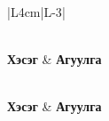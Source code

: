 \begin{longtable}{|L{4cm}|L{\dimexpr\textwidth-4cm-3\arrayrulewidth\relax}|}
\caption{Ажлын явц: Банкны загвар үүсгэх (UC-FS-02)}\label{tab:ucfs02}\\ \hline
\textbf{Хэсэг} & \textbf{Агуулга} \\ \hline
\endfirsthead

 \\ \hline
\textbf{Хэсэг} & \textbf{Агуулга} \\ \hline
\endhead

\hline {} \\ \hline
\endfoot

\hline
\endlastfoot


\end{longtable}
